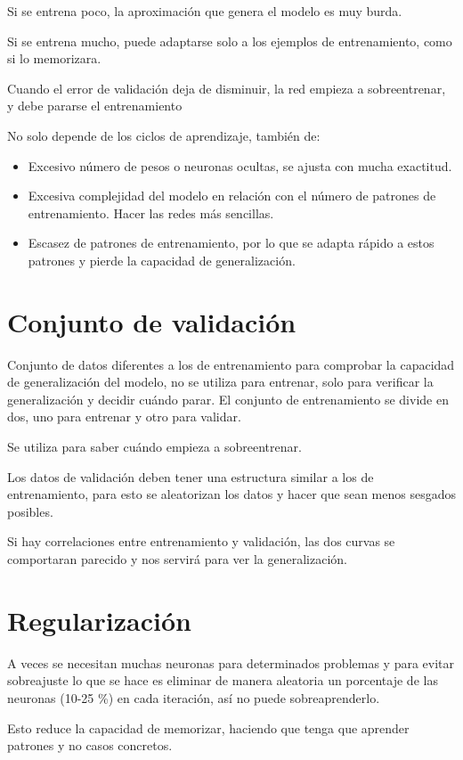 \documentclass[12pt, twoside, openright]{report} %
\begin{document}
Si se entrena poco, la aproximación que genera el modelo es muy burda.

Si se entrena mucho, puede adaptarse solo a los ejemplos de entrenamiento, como si lo memorizara.

Cuando el error de validación deja de disminuir, la red empieza a sobreentrenar, y debe pararse el entrenamiento

No solo depende de los ciclos de aprendizaje, también de:
\begin{itemize}
	\item Excesivo número de pesos o neuronas ocultas, se ajusta con mucha exactitud.
	\item Excesiva complejidad del modelo en relación con el número de patrones de entrenamiento. Hacer las redes más sencillas.
	\item Escasez de patrones de entrenamiento, por lo que se adapta rápido a estos patrones y pierde la capacidad de generalización.
\end{itemize}

\section{Conjunto de validación}
Conjunto de datos diferentes a los de entrenamiento para comprobar la capacidad de generalización del modelo, no se utiliza para entrenar, solo para verificar la generalización y decidir cuándo parar. El conjunto de entrenamiento se divide en dos, uno para entrenar y otro para validar.

Se utiliza para saber cuándo empieza a sobreentrenar.

Los datos de validación deben tener una estructura similar a los de entrenamiento, para esto se aleatorizan los datos y hacer que sean menos sesgados posibles.

Si hay correlaciones entre entrenamiento y validación, las dos curvas se comportaran parecido y nos servirá para ver la generalización.

\section{Regularización}
A veces se necesitan muchas neuronas para determinados problemas y para evitar sobreajuste lo que se hace es eliminar de manera aleatoria un porcentaje de las neuronas (10-25 \%) en cada iteración, así no puede sobreaprenderlo.

Esto reduce la capacidad de memorizar, haciendo que tenga que aprender patrones y no casos concretos.
\end{document}
